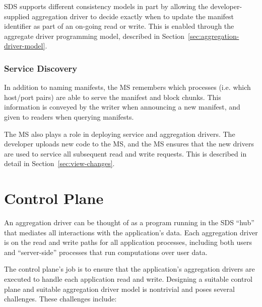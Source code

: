 SDS supports different consistency models in part by allowing the
developer-supplied aggregation driver to decide exactly when to update
the manifest identifier as part of an on-going read or write.
This is enabled through the aggregate driver programming model,
described in Section~\ref{sec:aggregation-driver-model}.

\subsubsection{Service Discovery}

In addition to naming manifests, the MS remembers which processes
(i.e. which host/port pairs) are able to serve the manifest and block chunks.
This information is conveyed by the writer when announcing a new manifest,
and given to readers when querying manifests.

The MS also plays a role in deploying service and aggregation drivers.  The
developer uploads new code to the MS, and the MS ensures that the new drivers
are used to service all subsequent read and write requests.  This is described
in detail in Section~\ref{sec:view-changes}.

\section{Control Plane}

An aggregation driver can be thought of as a program running in the SDS ``hub''
that mediates all interactions with the application's data.  Each aggregation
driver is on the read and write paths for all application processes, including
both users and ``server-side'' processes that run computations over user data.

The control plane's job is to ensure that the application's aggregation
drivers are executed to handle each application read and write.
Designing a suitable control plane and suitable aggregation driver
model is nontrivial and poses several challenges.  These challenges include:

